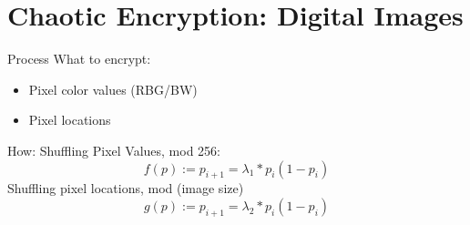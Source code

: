 \section{Chaotic Encryption:  Digital Images}
    
    \frame{\sectionpage}
    
    \begin{frame}{Process}
        \centering
        What to encrypt:
        \begin{itemize}
        	\item Pixel color values (RBG/BW)
        	\item Pixel locations
        \end{itemize}
    \end{frame}    


    \begin{frame}{How:}
        \centering
        Shuffling Pixel Values, mod 256:
        \begin{equation*}
            f ( p ) := p_{i+1} = \lambda_{1} * p_{i} ( 1 - p_{i} )
        \end{equation*}
        Shuffling pixel locations, mod (image size)
        \begin{equation*}
            g ( p ) := p_{i+1} = \lambda_{2} * p_{i} ( 1 - p_{i} )
        \end{equation*}
    \end{frame}
